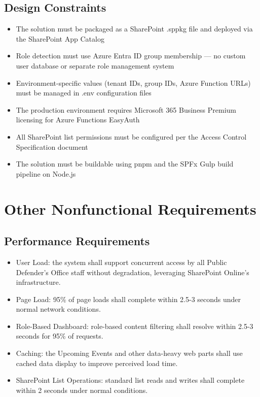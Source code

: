 \documentclass[12pt]{article}
\begin{document}
\subsection{Design Constraints}

\begin{itemize}[leftmargin=*]
\item  The solution must be packaged as a SharePoint .sppkg file and deployed via the SharePoint App Catalog
\item  Role detection must use Azure Entra ID group membership --- no custom user database or separate role management system
\item  Environment-specific values (tenant IDs, group IDs, Azure Function URLs) must be managed in .env configuration files
\item  The production environment requires Microsoft 365 Business Premium licensing for Azure Functions EasyAuth
\item  All SharePoint list permissions must be configured per the Access Control Specification document
\item  The solution must be buildable using pnpm and the SPFx Gulp build pipeline on Node.js
\end{itemize}

\section{Other Nonfunctional Requirements}

\subsection{Performance Requirements}

\begin{itemize}[leftmargin=*]
\item  User Load: the system shall support concurrent access by all Public Defender's Office staff without degradation, leveraging SharePoint Online's infrastructure.
\item  Page Load: 95\% of page loads shall complete within 2.5-3 seconds under normal network conditions.
\item  Role-Based Dashboard: role-based content filtering shall resolve within 2.5-3 seconds for 95\% of requests.
\item  Caching: the Upcoming Events and other data-heavy web parts shall use cached data display to improve perceived load time.
\item  SharePoint List Operations: standard list reads and writes shall complete within 2 seconds under normal conditions.
\end{itemize}
\end{document}
